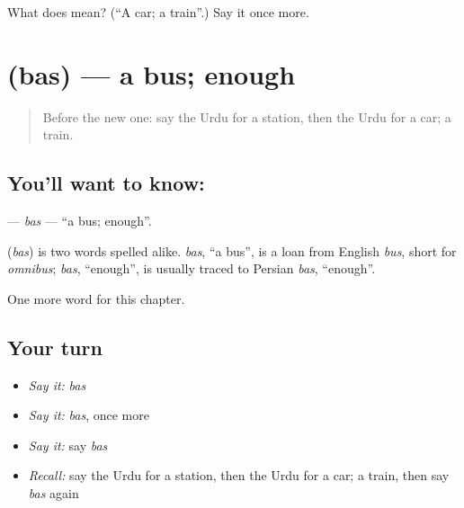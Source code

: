 \begin{tcolorbox}[breakable,colback=teal!4,colframe=teal!35!black,title={Before you move on}]
What does  mean? (\textquotedblleft{}A car; a train\textquotedblright{}.) Say it once more.
\end{tcolorbox}
\section[\texorpdfstring{\ur{بس} (bas)}{بس (bas)}]{ (bas) — a bus; enough}

\label{lesson:UR-C80-bas}



\begin{quote}
Before the new one: say the Urdu for a station, then the Urdu for a car; a train.
\end{quote}

\subsection*{You'll want to know: }
\textbf{} — \emph{bas} — \textquotedblleft{}a bus; enough\textquotedblright{}.

\begin{cousinweb}
\textbf{} (\emph{bas}) is two words spelled alike. \emph{bas}, \textquotedblleft{}a bus\textquotedblright{}, is a loan from English \emph{bus}, short for \emph{omnibus}; \emph{bas}, \textquotedblleft{}enough\textquotedblright{}, is usually traced to Persian \emph{bas}, \textquotedblleft{}enough\textquotedblright{}.
\end{cousinweb}

\begin{grammarlens}[title={What you've built}]
One more word for this chapter.
\end{grammarlens}

\subsection*{Your turn}
\begin{itemize}
\raggedright
  \item \emph{Say it:} \emph{bas}
  \item \emph{Say it:} \emph{bas}, once more
  \item \emph{Say it:} say \emph{bas}
  \item \emph{Recall:} say the Urdu for a station, then the Urdu for a car; a train, then say \emph{bas} again
\end{itemize}

